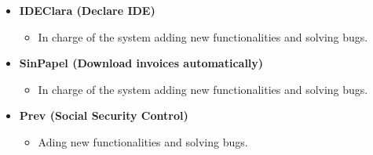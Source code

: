\documentclass[11pt,a4paper,sans,colorlinks]{moderncv} %
\begin{document}
{\begin{itemize}
\begin{itemize}
\begin{itemize}
            \item Modeling and coding the new specification 'CFDI 3.3' given by the Mexican Tax Agency (SAT).
            \item In charge of the system adding new functionalities and solving bugs.
          \end{itemize}
        \item \textbf{IDEClara (Declare IDE)}
          \begin{itemize}
            \item In charge of the system adding new functionalities and solving bugs.
          \end{itemize}
        \item \textbf{SinPapel (Download invoices automatically)}
          \begin{itemize}
            \item In charge of the system adding new functionalities and solving bugs.
          \end{itemize}
        \item \textbf{Prev (Social Security Control)}
          \begin{itemize}
            \item Ading new functionalities and solving bugs.
          \end{itemize}
      \end{itemize}
  \end{itemize}}

\end{document}
